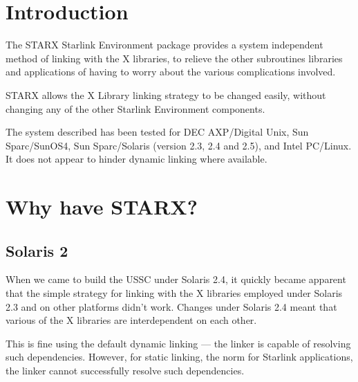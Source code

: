 
\section{Introduction}

The STARX Starlink Environment package provides a system independent
method of linking with the X libraries, to relieve the other
subroutines libraries and applications of having to worry about the
various complications involved.

STARX allows the X Library linking strategy to be changed easily, without
changing any of the other Starlink Environment components.

The system described has been tested for DEC AXP/Digital Unix, Sun
Sparc/SunOS4, Sun Sparc/Solaris (version 2.3, 2.4 and 2.5), and Intel
PC/Linux.  It does not appear to hinder dynamic linking where
available.

\section{Why have STARX?}

\subsection{Solaris 2}

When we came to build the USSC under Solaris 2.4, it quickly became
apparent that the simple strategy for linking with the X libraries
employed under Solaris 2.3 and on other platforms didn't work.  Changes
under Solaris 2.4 meant that various of the X libraries are
interdependent on each other.

This is fine using the default dynamic linking --- the linker is
capable of resolving such dependencies.  However, for static linking,
the norm for Starlink applications, the linker cannot successfully
resolve such dependencies.

